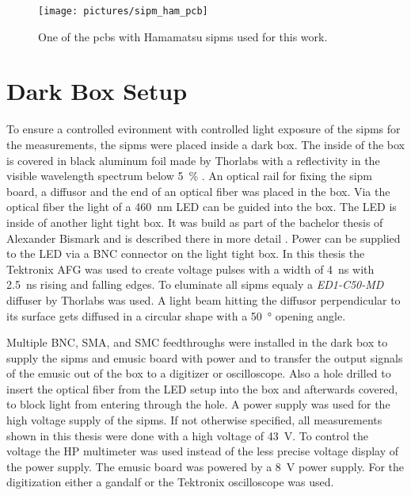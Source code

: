 \begin{figure}
	\centering
	\texttt{[image: pictures/sipm\_ham\_pcb]}
	\caption[\ac{pcb} with Hamamatsu \acp{sipm}]{One of the \acp{pcb} with Hamamatsu \acp{sipm} used for this work.}
	\label{fig:sipm_pcb}
\end{figure}

\section{Dark Box Setup}
To ensure a controlled evironment with controlled light exposure of the \acp{sipm} for the measurements, the \acp{sipm} were placed inside a dark box.
The inside of the box is covered in black aluminum foil made by Thorlabs with a reflectivity in the visible wavelength spectrum below \SI{5}{\percent} \cite{}.
An optical rail for fixing the \ac{sipm} board, a diffusor and the end of an optical fiber was placed in the box.
Via the optical fiber the light of a \SI{460}{\nano\meter} LED can be guided into the box.
The LED is inside of another light tight box.
It was build as part of the bachelor thesis of Alexander Bismark and is described there in more detail \cite{}.
Power can be supplied to the LED via a BNC connector on the light tight box.
In this thesis the Tektronix AFG was used to create voltage pulses with a width of \SI{4}{\nano\second} with \SI{2.5}{\nano\second} rising and falling edges.
To eluminate all \acp{sipm} equaly a \textit{ED1-C50-MD} diffuser by Thorlabs was used.
A light beam hitting the diffusor perpendicular to its surface gets diffused in a circular shape with a \SI{50}{\degree} opening angle.

Multiple BNC, SMA, and SMC feedthroughs were installed in the dark box to supply the \acp{sipm} and \ac{emusic} board with power and to transfer the output signals of the \ac{emusic} out of the box to a digitizer or oscilloscope.
Also a hole drilled to insert the optical fiber from the LED setup into the box and afterwards covered, to block light from entering through the hole.
A power supply was used for the high voltage supply of the \acp{sipm}.
If not otherwise specified, all measurements shown in this thesis were done with a high voltage of \SI{43}{\volt}.
To control the voltage the HP multimeter was used instead of the less precise voltage display of the power supply.
The \ac{emusic} board was powered by a \SI{8}{\volt} power supply.
For the digitization either a \ac{gandalf} or the Tektronix oscilloscope was used.

